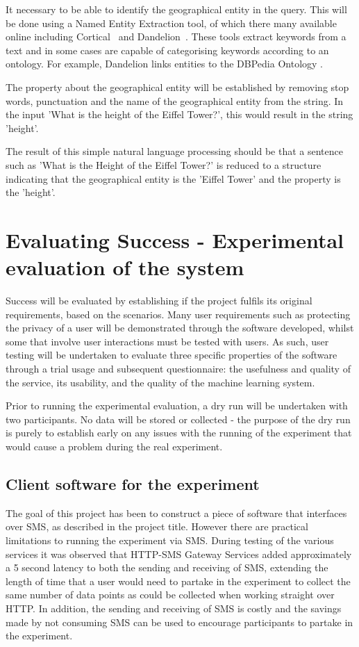 \documentclass[authoryearcitations]{UoYCSproject}
\begin{document}
It necessary to be able to identify the geographical entity in the query. This will be done using a Named Entity Extraction tool, of which there many available online including Cortical~\cite{serviceCorticalNex} and Dandelion~\cite{serviceDandelionNex}. These tools extract keywords from a text and in some cases are capable of categorising keywords according to an ontology. For example, Dandelion links entities to the DBPedia Ontology \cite{dandelionNex}.

The property about the geographical entity will be established by removing stop words, punctuation and the name of the geographical entity from the string.  In the input 'What is the height of the Eiffel Tower?', this would result in the string 'height'.

The result of this simple natural language processing should be that a sentence such as 'What is the Height of the Eiffel Tower?' is reduced to a structure indicating that the geographical entity is the 'Eiffel Tower' and the property is the 'height'.

\section{Evaluating Success - Experimental evaluation of the system}
\label{sec:evaluatingSuccess}
Success will be evaluated by establishing if the project fulfils its original requirements, based on the scenarios.  Many user requirements such as protecting the privacy of a user will be demonstrated through the software developed, whilst some that involve user interactions must be tested with users.  As such, user testing will be undertaken to evaluate three specific properties of the software through a trial usage and subsequent questionnaire: the usefulness and quality of the service, its usability, and the quality of the machine learning system.

Prior to running the experimental evaluation, a dry run will be undertaken with two participants. No data will be stored or collected - the purpose of the dry run is purely to establish early on any issues with the running of the experiment that would cause a problem during the real experiment.

\subsection{Client software for the experiment}
\label{subsec:clientSoftware}
The goal of this project has been to construct a piece of software that interfaces over SMS, as described in the project title. However there are practical limitations to running the experiment via SMS. During testing of the various services it was observed that HTTP-SMS Gateway Services added approximately a 5 second latency to both the sending and receiving of SMS, extending the length of time that a user would need to partake in the experiment to collect the same number of data points as could be collected when working straight over HTTP. In addition, the sending and receiving of SMS is costly and the savings made by not consuming SMS can be used to encourage participants to partake in the experiment. 
\end{document}
